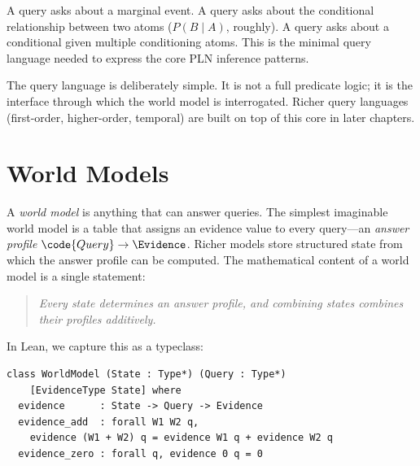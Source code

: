\documentclass[11pt,openany]{report}
\begin{document}
A  query asks about a marginal event.  A  query asks
about the conditional relationship between two atoms ($P(B \mid A)$, roughly).
A  query asks about a conditional given multiple conditioning
atoms.  This is the minimal query language needed to express the core PLN
inference patterns.

The query language is deliberately simple.  It is not a full predicate logic;
it is the interface through which the world model is interrogated.  Richer
query languages (first-order, higher-order, temporal) are built on top of
this core in later chapters.


\section{World Models}
\label{sec:world-models}

A \emph{world model} is anything that can answer queries.  The simplest
imaginable world model is a table that assigns an evidence value to
every query---an \emph{answer profile} $\code{Query} \to \Evidence$.
Richer models store structured state from which the answer profile can
be computed.  The mathematical content of a world model is a single
statement:

\begin{quote}
\emph{Every state determines an answer profile, and combining states
combines their profiles additively.}
\end{quote}

\noindent
In Lean, we capture this as a typeclass:

\begin{lstlisting}
class WorldModel (State : Type*) (Query : Type*)
    [EvidenceType State] where
  evidence      : State -> Query -> Evidence
  evidence_add  : forall W1 W2 q,
    evidence (W1 + W2) q = evidence W1 q + evidence W2 q
  evidence_zero : forall q, evidence 0 q = 0
\end{lstlisting}
\end{document}
